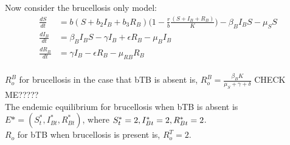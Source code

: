 \documentclass[letterpaper,12pt]{article}
\begin{document}
Now consider the brucellosis only model: 
\begin{align*}
\frac{dS}{dt} &= b (S+ b_2 I_{B} + b_3 R_{B}) \big(1 - \frac{r}{b} \frac{(S+ I_{B} + R_{B})}{K}\big)- \beta_B I_B S - \mu_{S} S  \\		      					%
\frac{dI_{B}}{dt}&=  \beta_B I_B S - \gamma I_{B} + \epsilon R_{B}  - \mu_{B} I_{B} \\ 		 					%
\frac{dR_{B}}{dt}&=  \gamma I_{B} - \epsilon R_{B} - \mu_{RB} R_{B} \\  										%
\end{align*}

$R_{o} ^B$ for brucellosis in the case that bTB is absent is, $R_{o}^{B} = \frac{\beta_B K}{\mu_S+\gamma + \delta}$  CHECK ME????? \\
The endemic equilibrium for brucellosis when bTB is absent is $E* = (S_{t}^*, I_{Bt}^*, R_{Bt}^*)$, where 
$S_{t}^* = 2, \\
I_{Bt}^* = 2, \\
R_{Bt}^* = 2$. \\
$R_o$ for bTB when brucellosis is present is, $R_{o}^{T} = 2$. \\
\end{document}
